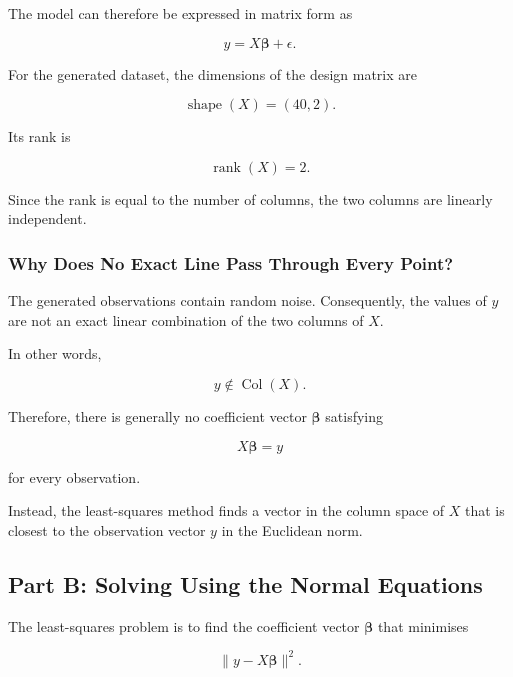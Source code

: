 \documentclass[12pt,a4paper]{article}
\numberwithin{equation}{section}
\begin{document}
The model can therefore be expressed in matrix form as

\begin{equation}
\boxed{y=X\boldsymbol{\beta}+\epsilon}.
\end{equation}

For the generated dataset, the dimensions of
the design matrix are

\begin{equation}
\boxed{\operatorname{shape}(X)=(40,2)}.
\end{equation}

Its rank is

\begin{equation}
\boxed{\operatorname{rank}(X)=2}.
\end{equation}

Since the rank is equal to the number of columns,
the two columns are linearly independent.

\subsubsection{Why Does No Exact Line Pass Through Every Point?}

The generated observations contain random noise.
Consequently, the values of $y$ are not an exact
linear combination of the two columns of $X$.

In other words,

\begin{equation}
y\notin\operatorname{Col}(X).
\end{equation}

Therefore, there is generally no coefficient vector
$\boldsymbol{\beta}$ satisfying

\begin{equation}
X\boldsymbol{\beta}=y
\end{equation}

for every observation.

Instead, the least-squares method finds a vector
in the column space of $X$ that is closest to
the observation vector $y$ in the Euclidean norm.

\subsection{Part B: Solving Using the Normal Equations}

The least-squares problem is to find the coefficient
vector $\boldsymbol{\beta}$ that minimises

\begin{equation}
\|y-X\boldsymbol{\beta}\|^2.
\end{equation}
\end{document}
